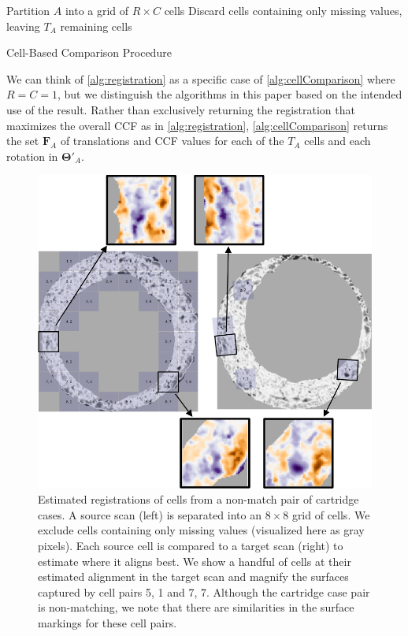 \documentclass[reprint]{JASA}
\begin{document}
\begin{algorithm}[H]
Partition $A$ into a grid of $R \times C$ cells\;
Discard cells containing only missing values, leaving $T_A$ remaining cells\;
\caption{Cell-Based Comparison Procedure}
\label{alg:cellComparison}
\end{algorithm}

We can think of \autoref{alg:registration} as a specific case of
\autoref{alg:cellComparison} where \(R = C = 1\), but we distinguish the
algorithms in this paper based on the intended use of the result. Rather
than exclusively returning the registration that maximizes the overall
CCF as in \autoref{alg:registration}, \autoref{alg:cellComparison}
returns the set \(\pmb{F}_A\) of translations and CCF values for each of
the \(T_A\) cells and each rotation in \(\pmb{\Theta}'_A\).

\begin{figure}[htbp]
\includegraphics[width=.5\textwidth]{images/cellGridExample_nonMatch} \caption{\label{fig:cellGridExample} Estimated registrations of cells from a non-match pair of cartridge cases. A source scan (left) is separated into an $8 \times 8$ grid of cells. We exclude cells containing only missing values (visualized here as gray pixels). Each source cell is compared to a target scan (right) to estimate where it aligns best. We show a handful of cells at their estimated alignment in the target scan and magnify the surfaces captured by cell pairs 5, 1 and 7, 7. Although the cartridge case pair is non-matching, we note that there are similarities in the surface markings for these cell pairs.}\label{fig:unnamed-chunk-4}
\end{figure}
\end{document}
